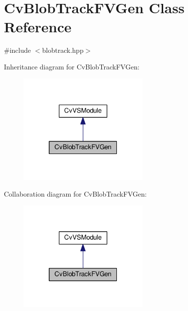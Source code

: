 \hypertarget{classCvBlobTrackFVGen}{\section{Cv\-Blob\-Track\-F\-V\-Gen Class Reference}
\label{classCvBlobTrackFVGen}
}


{\ttfamily \#include $<$blobtrack.\-hpp$>$}



Inheritance diagram for Cv\-Blob\-Track\-F\-V\-Gen\-:\nopagebreak
\begin{figure}[H]
\begin{center}
\leavevmode
\includegraphics[width=184pt]{classCvBlobTrackFVGen__inherit__graph}
\end{center}
\end{figure}


Collaboration diagram for Cv\-Blob\-Track\-F\-V\-Gen\-:\nopagebreak
\begin{figure}[H]
\begin{center}
\leavevmode
\includegraphics[width=184pt]{classCvBlobTrackFVGen__coll__graph}
\end{center}
\end{figure}
